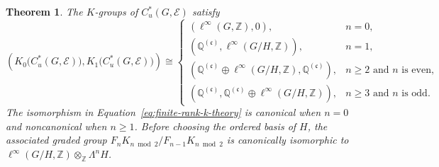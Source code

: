 \documentclass[pdflatex,sn-mathphys-num]{sn-jnl}%
\theoremstyle{plain}
\newtheorem{theorem}{Theorem}[section]
\theoremstyle{remark}
\theoremstyle{definition}
\numberwithin{equation}{section}
\begin{document}
\begin{theorem}
\label{thm:finite-rank-k-theory}
The \( K \)-groups of \( C_u^*(G,\mathcal E) \) satisfy
\begin{equation}
\label{eq:finite-rank-k-theory}
\left(
K_0\bigl(C_u^*(G,\mathcal E)\bigr),
K_1\bigl(C_u^*(G,\mathcal E)\bigr)
\right)
\cong
\begin{cases}
\left(
\ell^\infty(G,\mathbb Z),
0
\right),
& n=0,\\[1ex]
\left(
\mathbb Q^{(\mathfrak c)},
\ell^\infty(G/H,\mathbb Z)
\right),
& n=1,\\[1ex]
\left(
\mathbb Q^{(\mathfrak c)}
\oplus
\ell^\infty(G/H,\mathbb Z),
\mathbb Q^{(\mathfrak c)}
\right),
& n\geq2 \text{ and } n \text{ is even},\\[1ex]
\left(
\mathbb Q^{(\mathfrak c)},
\mathbb Q^{(\mathfrak c)}
\oplus
\ell^\infty(G/H,\mathbb Z)
\right),
& n\geq3 \text{ and } n \text{ is odd}.
\end{cases}
\end{equation}
The isomorphism in Equation~\eqref{eq:finite-rank-k-theory} is canonical when \( n=0 \) and noncanonical when \( n\geq1 \). Before choosing the ordered basis of \( H \), the associated graded group \( F_nK_{n\bmod 2}/F_{n-1}K_{n\bmod 2} \) is canonically isomorphic to \( \ell^\infty(G/H,\mathbb Z)\otimes_{\mathbb Z}\Lambda^nH \).
\end{theorem}
\end{document}
